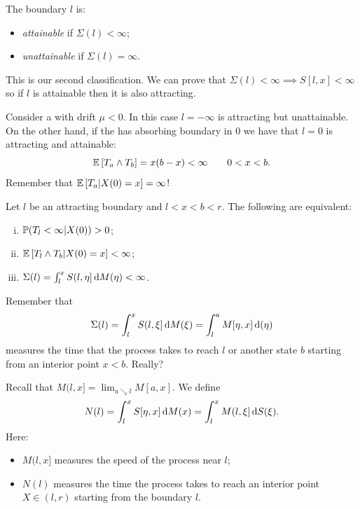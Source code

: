 \documentclass[12pt]{report}
\begin{document}
\begin{definition}
	The boundary $l$ is:
	\begin{itemize}
		\item \emph{attainable} if $\Sigma(l)<\infty$;
		\item \emph{unattainable} if $\Sigma(l)=\infty$.
	\end{itemize}
\end{definition}
This is our second classification. We can prove that $\Sigma(l)<\infty\implies S[l,x]<\infty$ so if $l$ is attainable then it is also attracting.\par
Consider a \bwm{} with drift $\mu<0$. In this case $l=-\infty$ is attracting but unattainable. On the other hand, if the \bwm{} has absorbing boundary in 0 we have that $l=0$ is attracting and attainable:
\begin{equation*}
	\mathbb{E}\left[T_{a}\wedge T_{b}\right]=x(b-x)<\infty\qquad0<x<b.
\end{equation*}
Remember that $\mathbb{E}\left[T_{a}|X(0)=x\right]=\infty$!
\begin{lemma}
	Let $l$ be an attracting boundary and $l<x<b<r$. The following are equivalent:
	\begin{enumerate}[i)]
		\item $\mathbb{P}(T_{l}<\infty|X(0))>0$;
		\item $\mathbb{E}\left[T_{l}\wedge T_{b}|X(0)=x\right]<\infty$;
		\item $\Sigma(l)=\int_{l}^{x}S(l,\eta]\mathop{}\!\mathrm{d} M(\eta)<\infty$. 
	\end{enumerate}
\end{lemma}
Remember that 
\begin{equation*}
	\Sigma(l)=\int_{l}^{x}S(l,\xi]\mathop{}\!\mathrm{d} M(\xi)=\int_{l}^{a}M[\eta,x]\mathop{}\!\mathrm{d}(\eta)
\end{equation*}
measures the time that the process takes to reach $l$ or another state $b$ starting from an interior point $x<b$. Really?
\begin{definition}
	Recall that $M(l,x]=\lim_{a\searrow l}M[a,x]$. We define
	\begin{equation*}
		N(l)=\int_{l}^{x}S[\eta,x]\mathop{}\!\mathrm{d} M(x)=\int_{l}^{x}M(l,\xi]\mathop{}\!\mathrm{d} S(\xi).
	\end{equation*}
	Here:
	\begin{itemize}
		\item $M(l,x]$ measures the speed of the process near $l$;
		\item $N(l)$ measures the time the process takes to reach an interior point $X\in(l,r)$ starting from the boundary $l$.
	\end{itemize}
\end{definition}
\end{document}

